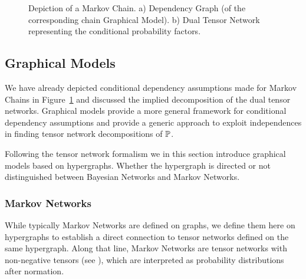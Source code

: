 \begin{figure}[h]
\begin{center}
	
\end{center}
\caption{Depiction of a Markov Chain. 
	a) Dependency Graph (of the corresponding chain Graphical Model).
	b) Dual Tensor Network representing the conditional probability factors.}
\label{fig:MC}
\end{figure}





\subsection{Graphical Models}



We have already depicted conditional dependency assumptions made for Markov Chains in Figure~\ref{fig:MC} and discussed the implied decomposition of the dual tensor networks.
Graphical models provide a more general framework for conditional dependency assumptions and provide a generic approach to exploit independences in finding tensor network decompositions of $\mathbb{P}$.


Following the tensor network formalism we in this section introduce graphical models based on hypergraphs.
Whether the hypergraph is directed or not distinguished between Bayesian Networks and Markov Networks.







\subsubsection{Markov Networks}

While typically Markov Networks are defined on graphs, we define them here on hypergraphs to establish a direct connection to tensor networks defined on the same hypergraph.
Along that line, Markov Networks are tensor networks with non-negative tensors (see ), which are interpreted as probability distributions after normation.

